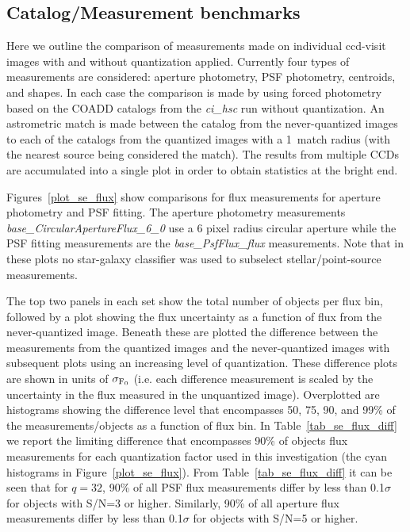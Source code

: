 
\subsection{Catalog/Measurement benchmarks}

Here we outline the comparison of measurements made on individual ccd-visit images with and without 
quantization applied.  Currently four types of measurements are considered: aperture photometry, 
PSF photometry, centroids, and shapes.  In each case the comparison is made by using forced 
photometry based on the COADD catalogs from the {\it ci\_hsc} run without quantization.
An astrometric match is made between the catalog from the never-quantized images to each of the
catalogs from the quantized images with a 1\arcsec\ match radius (with the nearest source being
considered the match).  The results from multiple CCDs are accumulated into a single plot in order
to obtain statistics at the bright end.

Figures~\ref{plot_se_flux} show comparisons for flux measurements for aperture photometry 
and PSF fitting.  The aperture photometry measurements {\it base\_CircularApertureFlux\_6\_0} 
use a 6 pixel radius circular aperture while the PSF fitting measurements are the
{\it base\_PsfFlux\_flux} measurements.  Note that in these plots no star-galaxy classifier 
was used to subselect stellar/point-source measurements.

The top two panels in each set show the total number of objects per flux bin, followed by a plot 
showing the flux uncertainty as a function of flux from the never-quantized image.  Beneath these 
are plotted the difference between the measurements from the quantized images and the never-quantized 
images with subsequent plots using an increasing level of quantization.  These difference 
plots are shown in units of $\sigma_{\rm F_0}$ (i.e. each difference measurement is scaled by the
uncertainty in the flux measured in the unquantized image).  Overplotted are histograms showing the 
difference level that encompasses 50, 75, 90, and 99\% of the measurements/objects as a function 
of flux bin.  In Table~\ref{tab_se_flux_diff} we report the limiting difference that encompasses
90\% of objects flux measurements for each quantization factor used in this investigation (the cyan
histograms in Figure~\ref{plot_se_flux}).  From Table~\ref{tab_se_flux_diff} it can be seen
that for $q=32$, 90\% of all PSF flux measurements differ by less than 0.1$\sigma$ for objects 
with S/N=3 or higher.   Similarly, 90\% of all aperture flux measurements differ by less than 0.1$\sigma$
for objects with S/N=5 or higher.

